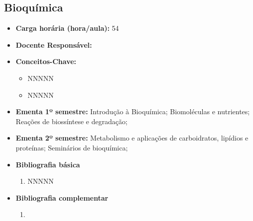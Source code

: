 \documentclass[11pt,fleqn]{book} %
\begin{document}
\subsection{Bioquímica}\label{disc:bioquimica}
\begin{itemize}
	\item \textbf{Carga horária (hora/aula):} 54
	\item \textbf{Docente Responsável:}
	\item \textbf{Conceitos-Chave:}
	\begin{itemize}
		\item NNNNN
		\item NNNNN
	\end{itemize}
	\item \textbf{Ementa 1º semestre:}
	Introdução à Bioquímica; 
	Biomoléculas e nutrientes;
	Reações de biossíntese e degradação;
	\item \textbf{Ementa 2º semestre:}	
	Metabolismo e aplicações de carboidratos, lipídios e proteínas;
	Seminários de bioquímica;
	\item \textbf{Bibliografia básica}
	\begin{enumerate}
		\item NNNNN
	\end{enumerate}
	\item \textbf{Bibliografia complementar}
	\begin{enumerate}
		\item 
	\end{enumerate}	
\end{itemize}


\newpage
\end{document}
